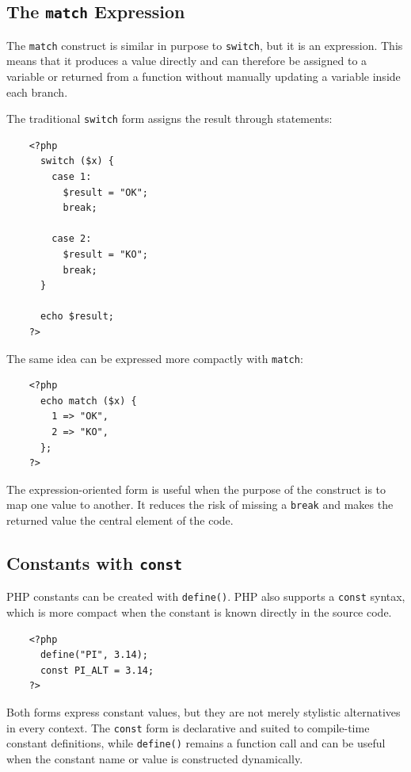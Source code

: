 \documentclass{scrbook}
\begin{document}
	\subsection{The \texttt{match} Expression}
	
	The \texttt{match} construct is similar in purpose to \texttt{switch}, but it is an expression. This means that it produces a value directly and can therefore be assigned to a variable or returned from a function without manually updating a variable inside each branch.
	
	The traditional \texttt{switch} form assigns the result through statements:
	
	\begin{lstlisting}
	<?php
	  switch ($x) {
		case 1:
		  $result = "OK";
		  break;
		
		case 2:
		  $result = "KO";
		  break;
	  }
	
	  echo $result;
	?>
	\end{lstlisting}
	
	The same idea can be expressed more compactly with \texttt{match}:
	
	\begin{lstlisting}
	<?php
	  echo match ($x) {
		1 => "OK",
		2 => "KO",
	  };
	?>
	\end{lstlisting}
	
	The expression-oriented form is useful when the purpose of the construct is to map one value to another. It reduces the risk of missing a \texttt{break} and makes the returned value the central element of the code.
	
	\subsection{Constants with \texttt{const}}
	
	PHP constants can be created with \texttt{define()}. PHP also supports a \texttt{const} syntax, which is more compact when the constant is known directly in the source code.
	
	\begin{lstlisting}
	<?php
	  define("PI", 3.14);
	  const PI_ALT = 3.14;
	?>
	\end{lstlisting}
	
	Both forms express constant values, but they are not merely stylistic alternatives in every context. The \texttt{const} form is declarative and suited to compile-time constant definitions, while \texttt{define()} remains a function call and can be useful when the constant name or value is constructed dynamically.
	
\end{document}
